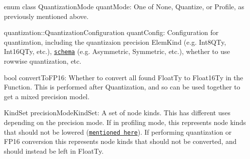 \begin{DoxyItemize}
\begin{DoxyItemize}
\begin{DoxyItemize}
\item {\ttfamily enum class Quantization\+Mode quant\+Mode}\+: One of {\ttfamily None}, {\ttfamily Quantize}, or {\ttfamily Profile}, as previously mentioned above.
\item {\ttfamily quantization\+::\+Quantization\+Configuration quant\+Config}\+: Configuration for quantization, including the quantizaion precision {\ttfamily Elem\+Kind} (e.\+g. {\ttfamily Int8\+Q\+Ty}, {\ttfamily Int16\+Q\+Ty}, etc.), \href{Quantization.md#how-to-perform-nn-conversion}{\tt schema} (e.\+g. Asymmetric, Symmetric, etc.), whether to use rowwise quantization, etc.
\item {\ttfamily bool convert\+To\+F\+P16}\+: Whether to convert all found {\ttfamily Float\+Ty} to {\ttfamily Float16\+Ty} in the Function. This is performed after Quantization, and so can be used together to get a mixed precision model.
\item {\ttfamily Kind\+Set precision\+Mode\+Kind\+Set}\+: A set of node kinds. This has different uses depending on the precision mode. If in profiling mode, this represents node kinds that should not be lowered (\href{Quantization.md#how-to-perform-nn-conversion}{\tt mentioned here}). If performing quantization or F\+P16 conversion this represents node kinds that should not be converted, and should instead be left in Float\+Ty. 
\end{DoxyItemize}
\end{DoxyItemize}
\end{DoxyItemize}